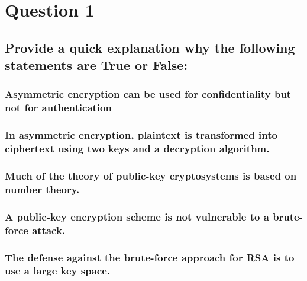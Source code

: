 \documentclass{report}
\begin{document}
	\section{Question 1}
	\startsection
		\renewcommand{\thesubsection}{\thesection.\Alph{subsection}}
		\subsection{Provide a quick explanation why the following statements are True or False:}
		\startsubsection
			\subsubsection{Asymmetric encryption can be used for confidentiality but not for authentication}
			\startsubsection
			\closesection
			\subsubsection{In asymmetric encryption, plaintext is transformed into ciphertext using two keys and a decryption algorithm.}
			\startsubsection
			\closesection
			\subsubsection{Much of the theory of public-key cryptosystems is based on number theory.}
			\startsubsection
			\closesection
			\subsubsection{A public-key encryption scheme is not vulnerable to a brute-force attack.}
			\startsubsection
			\closesection
			\subsubsection{The defense against the brute-force approach for RSA is to use a large key space.}
			\startsubsection
			\closesection
		\closesection
	\closesection
\end{document}
